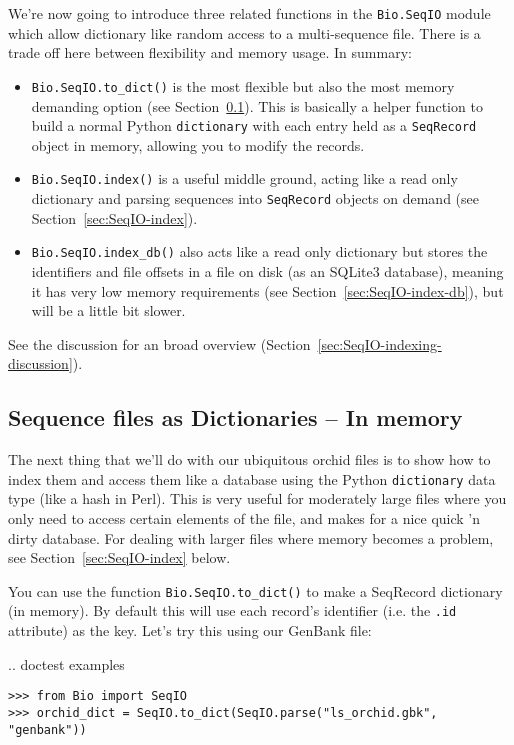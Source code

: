 We're now going to introduce three related functions in the \verb|Bio.SeqIO|
module which allow dictionary like random access to a multi-sequence file.
There is a trade off here between flexibility and memory usage. In summary:
\begin{itemize}
\item \verb|Bio.SeqIO.to_dict()| is the most flexible but also the most
memory demanding option (see Section~\ref{sec:seqio_todict}). This is basically
a helper function to build a normal Python \verb|dictionary| with each entry
held as a \verb|SeqRecord| object in memory, allowing you to modify the
records.
\item \verb|Bio.SeqIO.index()| is a useful middle ground, acting like a
read only dictionary and parsing sequences into \verb|SeqRecord| objects
on demand (see Section~\ref{sec:SeqIO-index}).
\item \verb|Bio.SeqIO.index_db()| also acts like a read only dictionary
but stores the identifiers and file offsets in a file on disk (as an
SQLite3 database), meaning it has very low memory requirements (see
Section~\ref{sec:SeqIO-index-db}), but will be a little bit slower.
\end{itemize}
See the discussion for an broad overview
(Section~\ref{sec:SeqIO-indexing-discussion}).

\subsection{Sequence files as Dictionaries -- In memory}
\label{sec:seqio_todict}

The next thing that we'll do with our ubiquitous orchid files is to show how
to index them and access them like a database using the Python \verb|dictionary|
data type (like a hash in Perl). This is very useful for moderately large files
where you only need to access certain elements of the file, and makes for a nice
quick 'n dirty database. For dealing with larger files where memory becomes a
problem, see Section~\ref{sec:SeqIO-index} below.

You can use the function \verb|Bio.SeqIO.to_dict()| to make a SeqRecord dictionary
(in memory).  By default this will use each record's identifier (i.e. the \verb|.id|
attribute) as the key.  Let's try this using our GenBank file:

\pandocignoreme .. doctest examples
\begin{verbatim}
>>> from Bio import SeqIO
>>> orchid_dict = SeqIO.to_dict(SeqIO.parse("ls_orchid.gbk", "genbank"))
\end{verbatim}

